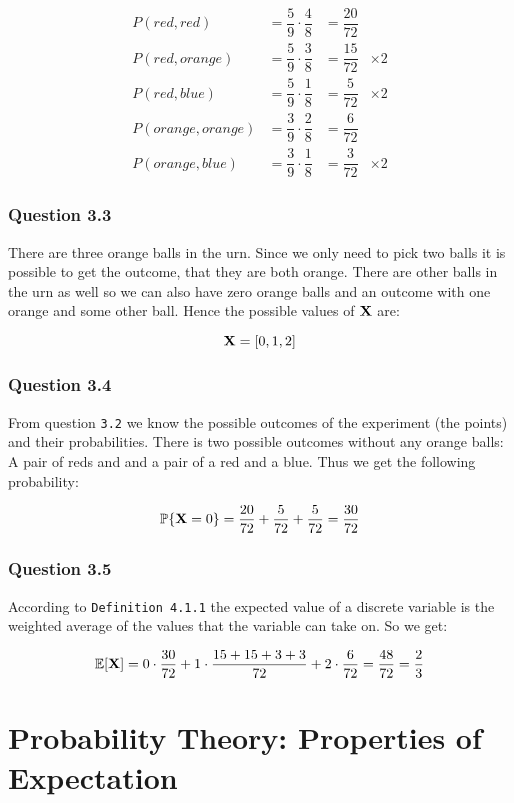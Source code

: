 \documentclass{article}
\begin{document}
\[
\renewcommand{\arraystretch}{3}
\begin{array}{llll}
P(red, red) & = \dfrac{5}{9} \cdot \dfrac{4}{8} & = \dfrac{20}{72} & \\
P(red, orange) & = \dfrac{5}{9} \cdot \dfrac{3}{8} & = \dfrac{15}{72} & \times 2 \\
P(red, blue) & = \dfrac{5}{9} \cdot \dfrac{1}{8} & = \dfrac{5}{72} & \times 2 \\
P(orange, orange) & = \dfrac{3}{9} \cdot \dfrac{2}{8} & = \dfrac{6}{72} & \\
P(orange, blue) & = \dfrac{3}{9} \cdot \dfrac{1}{8} & = \dfrac{3}{72} & \times 2
\end{array}
\]


\subsubsection*{Question 3.3}
There are three orange balls in the urn. Since we only need to pick two balls it
is possible to get the outcome, that they are both orange. There are other balls
in the urn as well so we can also have zero orange balls and an outcome with one
orange and some other ball. Hence the possible values of \({\mathbf X}\) are:

\[
{\mathbf X} = [0,1,2]
\]


\subsubsection*{Question 3.4}
From question \texttt{3.2} we know the possible outcomes of the experiment (the
points) and their probabilities. There is two possible outcomes without any
orange balls: A pair of reds and and a pair of a red and a blue. Thus we get the
following probability:

\[
\mathbb{P}\{{\mathbf X} = 0\} = \dfrac{20}{72} + \dfrac{5}{72} + \dfrac{5}{72} = \dfrac{30}{72}
\]


\subsubsection*{Question 3.5}
According to \cite{prob} \texttt{Definition 4.1.1} the expected value of a
discrete variable is the weighted average of the values that the variable can
take on. So we get:

\[
{\mathbb{E}}[{\mathbf X}] = 0 \cdot \dfrac{30}{72} + 1 \cdot \dfrac{15 + 15 + 3 + 3}{72} + 2
\cdot \dfrac{6}{72} = \dfrac{48}{72} = \dfrac{2}{3}
\]

\section{Probability Theory: Properties of Expectation}
\end{document}
